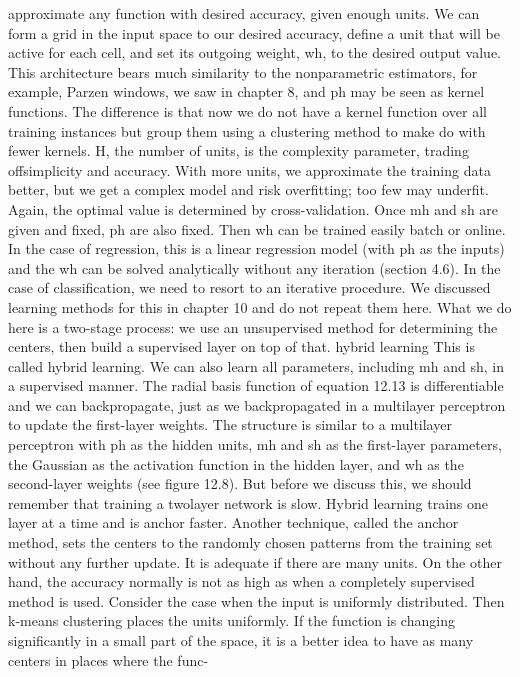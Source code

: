 approximate any function with desired accuracy, given enough units. We can form a grid in the input space to our desired accuracy, define a unit that will be active for each cell, and set its outgoing weight, wh, to the desired output value. This architecture bears much similarity to the nonparametric estimators, for example, Parzen windows, we saw in chapter 8, and ph may be seen as kernel functions. The difference is that now we do not have a kernel function over all training instances but group them using a clustering method to make do with fewer kernels. H, the number of units, is the complexity parameter, trading offsimplicity and accuracy. With more units, we approximate the training data better, but we get a complex model and risk overfitting; too few may underfit. Again, the optimal value is determined by cross-validation. Once mh and sh are given and fixed, ph are also fixed. Then wh can be trained easily batch or online. In the case of regression, this is a linear regression model (with ph as the inputs) and the wh can be solved analytically without any iteration (section 4.6). In the case of classification, we need to resort to an iterative procedure. We discussed learning methods for this in chapter 10 and do not repeat them here. What we do here is a two-stage process: we use an unsupervised method for determining the centers, then build a supervised layer on top of that. hybrid learning This is called hybrid learning. We can also learn all parameters, including mh and sh, in a supervised manner. The radial basis function of equation 12.13 is differentiable and we can backpropagate, just as we backpropagated in a multilayer perceptron to update the first-layer weights. The structure is similar to a multilayer perceptron with ph as the hidden units, mh and sh as the first-layer parameters, the Gaussian as the activation function in the hidden layer, and wh as the second-layer weights (see figure 12.8). But before we discuss this, we should remember that training a twolayer network is slow. Hybrid learning trains one layer at a time and is anchor faster. Another technique, called the anchor method, sets the centers to the randomly chosen patterns from the training set without any further update. It is adequate if there are many units. On the other hand, the accuracy normally is not as high as when a completely supervised method is used. Consider the case when the input is uniformly distributed. Then k-means clustering places the units uniformly. If the function is changing significantly in a small part of the space, it is a better idea to have as many centers in places where the func-

